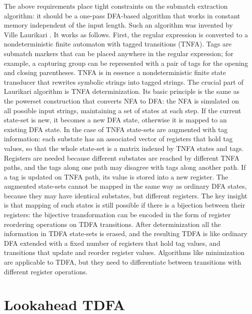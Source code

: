 \documentclass[preprint,12pt, a4paper]{elsarticle}
\begin{document}
\noindent
The above requirements place tight constraints on the submatch extraction algorithm:
it should be a one-pass DFA-based algorithm that works in constant memory independent of the input length.
Such an algorithm was invented by Ville Laurikari \cite{Lau00}.
It works as follows.
First, the regular expression is converted to a nondeterministic finite automaton with tagged transitions (TNFA).
Tags are submatch markers that can be placed anywhere in the regular expression;
for example, a capturing group can be represented with a pair of tags for the opening and closing parentheses.
TNFA is in essence a nondeterministic finite state transducer that rewrites symbolic strings into tagged strings.
The crucial part of Laurikari algorithm is TNFA determinization.
Its basic principle is the same as the powerset construction that converts NFA to DFA:
the NFA is simulated on all possible input strings, maintaining a set of states at each step.
If the current state-set is new, it becomes a new DFA state, otherwise it is mapped to an existing DFA state.
In the case of TNFA state-sets are augmented with tag information:
each substate has an associated vector of registers that hold tag values,
so that the whole state-set is a matrix indexed by TNFA states and tags.
Registers are needed because different substates are reached by different TNFA paths,
and the tags along one path may disagree with tags along another path.
If a tag is updated on TNFA path, its value is stored into a new register.
The augmented state-sets cannot be mapped in the same way as ordinary DFA states,
because they may have identical substates, but different registers.
The key insight is that mapping of such states is still possible if there is a bijection between their registers:
the bijective transformation can be encoded in the form of register reordering operations on TDFA transitions.
After determinization all the information in TDFA state-sets is erased,
and the resulting TDFA is like ordinary DFA extended with a fixed number of registers that hold tag values,
and transitions that update and reorder register values.
Algorithms like minimization are applicable to TDFA,
but they need to differentiate between transitions with different register operations.

\section{Lookahead TDFA}
\end{document}
